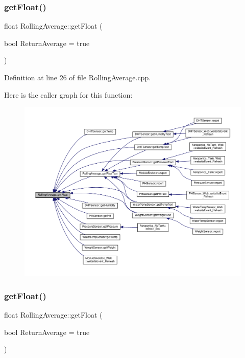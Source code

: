 \subsubsection{\texorpdfstring{get\+Float()}{getFloat()}\hspace{0.1cm}{\footnotesize\ttfamily [1/2]}}
{\footnotesize\ttfamily float Rolling\+Average\+::get\+Float (\begin{DoxyParamCaption}\item[{bool}]{Return\+Average = {\ttfamily true} }\end{DoxyParamCaption})}



Definition at line 26 of file Rolling\+Average.\+cpp.

Here is the caller graph for this function\+:
\nopagebreak
\begin{figure}[H]
\begin{center}
\leavevmode
\includegraphics[width=350pt]{class_rolling_average_ada0ea15c7152230f9433329fba92d3f8_icgraph}
\end{center}
\end{figure}
\mbox{\label{class_rolling_average_ada0ea15c7152230f9433329fba92d3f8}} 
\subsubsection{\texorpdfstring{get\+Float()}{getFloat()}\hspace{0.1cm}{\footnotesize\ttfamily [2/2]}}
{\footnotesize\ttfamily float Rolling\+Average\+::get\+Float (\begin{DoxyParamCaption}\item[{bool}]{Return\+Average = {\ttfamily true} }\end{DoxyParamCaption})}

